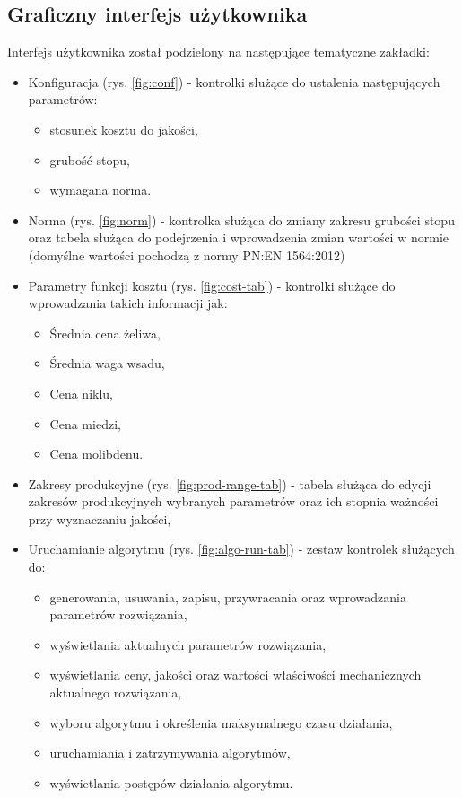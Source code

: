 \subsection{Graficzny interfejs użytkownika}
Interfejs użytkownika został podzielony na następujące tematyczne zakładki:
\begin{itemize}
    \item Konfiguracja (rys. \ref{fig:conf}) - kontrolki służące do ustalenia następujących parametrów:
    \begin{itemize}
        \item stosunek kosztu do jakości,
        \item grubość stopu,
        \item wymagana norma.
    \end{itemize}
    \item Norma (rys. \ref{fig:norm}) - kontrolka służąca do zmiany zakresu grubości stopu oraz tabela służąca do podejrzenia i wprowadzenia zmian wartości w normie (domyślne wartości pochodzą z normy PN:EN 1564:2012) 
    \item Parametry funkcji kosztu (rys. \ref{fig:cost-tab}) - kontrolki służące do wprowadzania takich informacji jak:
    \begin{itemize}
        \item Średnia cena żeliwa,
        \item Średnia waga wsadu,
        \item Cena niklu,
        \item Cena miedzi,
        \item Cena molibdenu.
    \end{itemize}
    \item Zakresy produkcyjne (rys. \ref{fig:prod-range-tab}) - tabela służąca do edycji zakresów produkcyjnych wybranych parametrów oraz ich stopnia ważności przy wyznaczaniu jakości,
    \item Uruchamianie algorytmu (rys. \ref{fig:algo-run-tab}) - zestaw kontrolek służących do:
    \begin{itemize}
        \item generowania, usuwania, zapisu, przywracania oraz wprowadzania parametrów rozwiązania,
        \item wyświetlania aktualnych parametrów rozwiązania,
        \item wyświetlania ceny, jakości oraz wartości właściwości mechanicznych aktualnego rozwiązania,
        \item wyboru algorytmu i określenia maksymalnego czasu działania,
        \item uruchamiania i zatrzymywania algorytmów,
        \item wyświetlania postępów działania algorytmu.
    \end{itemize}
\end{itemize}
